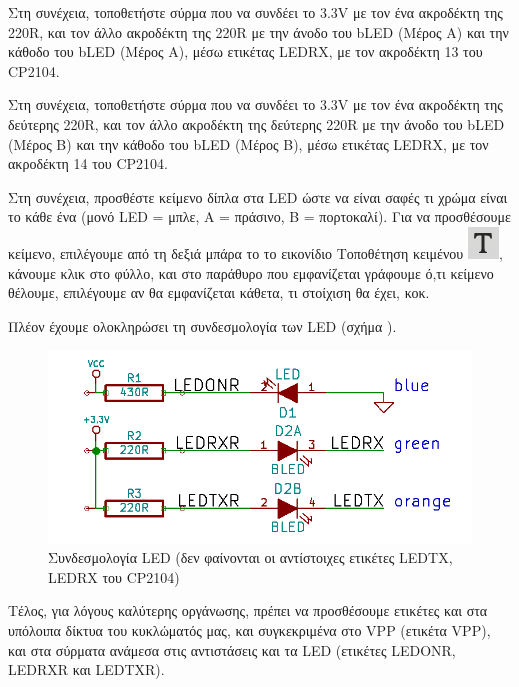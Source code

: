 \documentclass[a4paper]{article}
\begin{document}
Στη συνέχεια, τοποθετήστε σύρμα που να συνδέει το 3.3V με τον ένα ακροδέκτη της 220R, και τον άλλο ακροδέκτη της 220R με την άνοδο του bLED (Μέρος Α) και την κάθοδο του bLED (Μέρος Α), μέσω ετικέτας LEDRX, με τον ακροδέκτη 13 του CP2104.

Στη συνέχεια, τοποθετήστε σύρμα που να συνδέει το 3.3V με τον ένα ακροδέκτη της δεύτερης 220R, και τον άλλο ακροδέκτη της δεύτερης 220R με την άνοδο του bLED (Μέρος Β) και την κάθοδο του bLED (Μέρος Β), μέσω ετικέτας LEDRX, με τον ακροδέκτη 14 του CP2104.

Στη συνέχεια, προσθέστε κείμενο δίπλα στα LED ώστε να είναι σαφές τι χρώμα είναι το κάθε ένα (μονό LED = μπλε, A = πράσινο, B = πορτοκαλί). Για να προσθέσουμε κείμενο, επιλέγουμε από τη δεξιά μπάρα το το εικονίδιο Τοποθέτηση κειμένου \includegraphics[scale=.5]{img/eesch-ico-text.png}, κάνουμε κλικ στο φύλλο, και στο παράθυρο που εμφανίζεται γράφουμε ό,τι κείμενο θέλουμε, επιλέγουμε αν θα εμφανίζεται κάθετα, τι στοίχιση θα έχει, κοκ.

Πλέον έχουμε ολοκληρώσει τη συνδεσμολογία των LED (σχήμα \label{fig:eesch-circ-ledonly}).

\begin{figure}
  \begin{center}
    \includegraphics[width=.9\textwidth]{img/eesch-circ-ledonly.png}
    \caption{Συνδεσμολογία LED (δεν φαίνονται οι αντίστοιχες ετικέτες LEDTX, LEDRX του CP2104)}
    \label{fig:eesch-circ-ledonly}
  \end{center}
\end{figure}

Τέλος, για λόγους καλύτερης οργάνωσης, πρέπει να προσθέσουμε ετικέτες και στα υπόλοιπα δίκτυα του κυκλώματός μας, και συγκεκριμένα στο VPP (ετικέτα VPP), και στα σύρματα ανάμεσα στις αντιστάσεις και τα LED (ετικέτες LEDONR, LEDRXR και LEDTXR).
\end{document}
